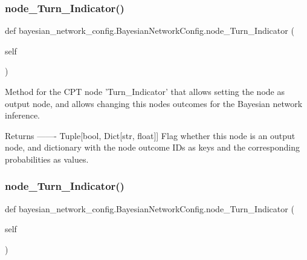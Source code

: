 \subsubsection{\texorpdfstring{node\+\_\+\+Turn\+\_\+\+Indicator()}{node\_Turn\_Indicator()}\hspace{0.1cm}{\footnotesize\ttfamily [1/2]}}
{\footnotesize\ttfamily def bayesian\+\_\+network\+\_\+config.\+Bayesian\+Network\+Config.\+node\+\_\+\+Turn\+\_\+\+Indicator (\begin{DoxyParamCaption}\item[{}]{self }\end{DoxyParamCaption})}

\begin{DoxyVerb}Method for the CPT node 'Turn_Indicator' that allows setting the node as output node,
and allows changing this nodes outcomes for the Bayesian network inference.

Returns
-------
Tuple[bool, Dict[str, float]]
    Flag whether this node is an output node, and dictionary with the node outcome IDs as keys
    and the corresponding probabilities as values.
\end{DoxyVerb}
 \mbox{\label{classbayesian__network__config_1_1_bayesian_network_config_ac9fee7655297b9617622e9c4d4669a23}} 
\subsubsection{\texorpdfstring{node\+\_\+\+Turn\+\_\+\+Indicator()}{node\_Turn\_Indicator()}\hspace{0.1cm}{\footnotesize\ttfamily [2/2]}}
{\footnotesize\ttfamily def bayesian\+\_\+network\+\_\+config.\+Bayesian\+Network\+Config.\+node\+\_\+\+Turn\+\_\+\+Indicator (\begin{DoxyParamCaption}\item[{}]{self }\end{DoxyParamCaption})}

